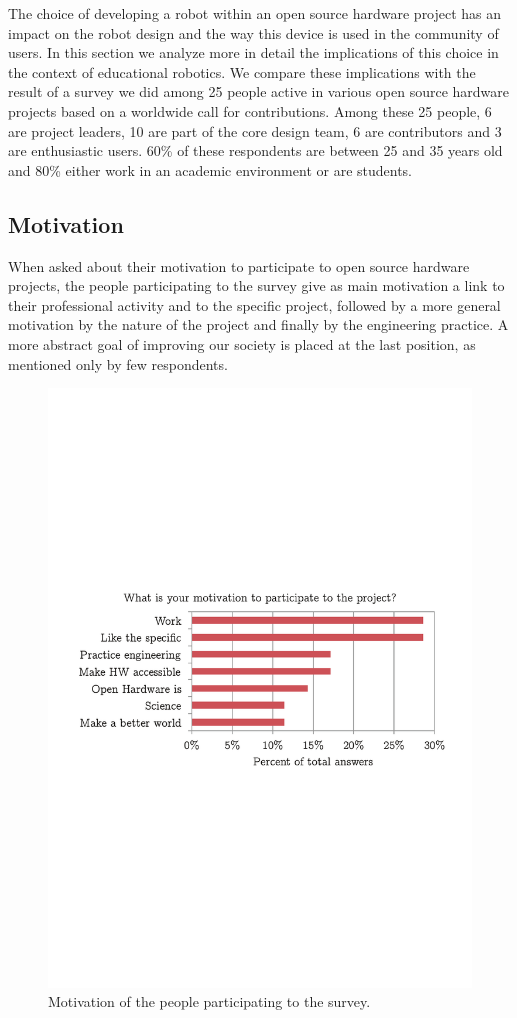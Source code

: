 \documentclass[letterpaper, 10 pt, conference]{ieeeconf}  %
\begin{document}
The choice of developing a robot within an open source hardware project has an impact on the robot design and the way this device is used in the community of users. 
In this section we analyze more in detail the implications of this choice in the context of educational robotics.
We compare these implications with the result of a survey we did among 25 people active in various open source hardware projects based on a worldwide call for contributions. 
Among these 25 people, 6 are project leaders, 10 are part of the core design team, 6 are contributors and 3 are enthusiastic users.
60\% of these respondents are between 25 and 35 years old and 80\% either work in an academic environment or are students. 

\subsection{Motivation}

When asked about their motivation to participate to open source hardware projects, the people participating to the survey give as main motivation a link to their professional activity and to the specific project, followed by a more general motivation by the nature of the project and finally by the engineering practice. 
A more abstract goal of improving our society is placed at the last position, as mentioned only by few respondents.

\begin{figure}
\centering
\includegraphics[width=.7\columnwidth]{figures/motivation}
\caption{Motivation of the people participating to the survey.}
\label{fig:motivation}
\end{figure}
\end{document}
